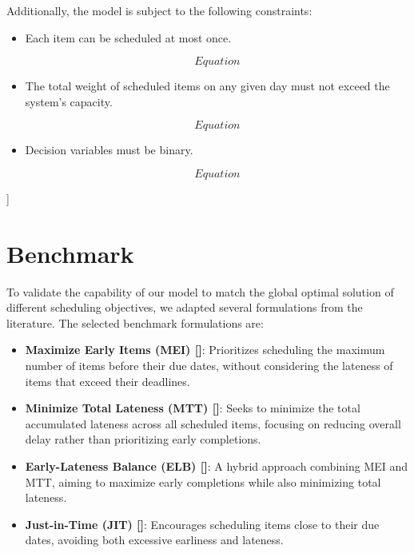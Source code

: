 \documentclass[12pt]{article}
\begin{document}
Additionally, the model is subject to the following constraints:

\begin{itemize}
    \item Each item can be scheduled at most once.

    \begin{equation}
        Equation
    \end{equation}

    \item The total weight of scheduled items on any given day must not exceed the system’s capacity.

    \begin{equation}
        Equation
    \end{equation}
    
    \item Decision variables must be binary.
    
    \begin{equation}
        Equation
    \end{equation}
\end{itemize}]

\section*{Benchmark}

To validate the capability of our model to match the global optimal solution of different scheduling objectives, we adapted several formulations from the literature. The selected benchmark formulations are:

\begin{itemize}
    \item \textbf{Maximize Early Items (MEI) []}: Prioritizes scheduling the maximum number of items before their due dates, without considering the lateness of items that exceed their deadlines.
    \item \textbf{Minimize Total Lateness (MTT) []}: Seeks to minimize the total accumulated lateness across all scheduled items, focusing on reducing overall delay rather than prioritizing early completions.
    \item \textbf{Early-Lateness Balance (ELB) []}: A hybrid approach combining MEI and MTT, aiming to maximize early completions while also minimizing total lateness.
    \item \textbf{Just-in-Time (JIT) []}: Encourages scheduling items close to their due dates, avoiding both excessive earliness and lateness.
\end{itemize}
\end{document}
